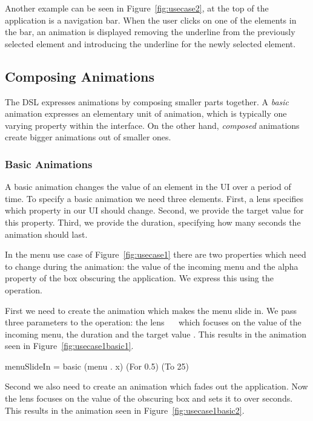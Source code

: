 Another example can be seen in Figure~\ref{fig:usecase2}, at the top of the application is a navigation bar. When the user clicks on one of the elements in the bar, an animation is displayed removing the underline from the previously selected element and introducing the underline for the newly selected element.

\subsection{Composing Animations}

The DSL expresses animations by composing smaller parts together. A \emph{basic} animation expresses an elementary unit of animation, which is typically one varying property within the interface. On the other hand, \emph{composed} animations create bigger animations out of smaller ones.

\subsubsection{Basic Animations}

A basic animation changes the value of an element in the UI over a period of time. To specify a basic animation we need three elements. First, a lens specifies which property in our UI should change. Second, we provide the target value for this property. Third, we provide the duration, specifying how many seconds the animation should last.

In the menu use case of Figure~\ref{fig:usecase1} there are two properties which need to change during the animation: the  value of the incoming menu and the alpha property of the box obscuring the application. We express this using the  operation.

First we need to create the animation which makes the menu slide in. We pass three parameters to the  operation: the lens ~~ which focuses on the  value of the incoming menu, the duration  and the target value . This results in the animation seen in Figure~\ref{fig:usecase1basic1}.

\begin{spec}
menuSlideIn = basic (menu . x) (For 0.5) (To 25)
\end{spec}

Second we also need to create an animation which fades out the application. Now the lens focuses on the  value of the obscuring box and sets it to  over  seconds. This results in the animation seen in Figure~\ref{fig:usecase1basic2}.

